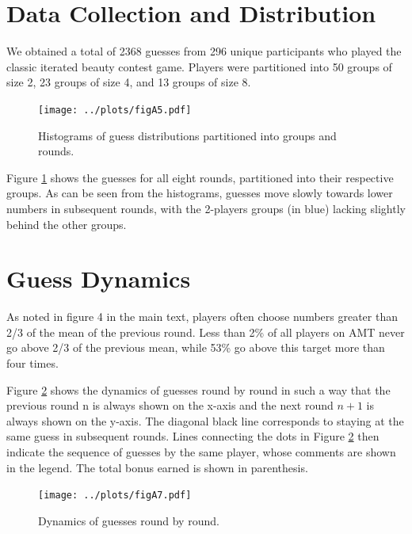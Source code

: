 \section{Data Collection and Distribution}
We obtained a total of 2368 guesses from 296 unique participants who played the classic iterated beauty contest game. Players were partitioned into 50 groups of size 2, 23 groups of size 4, and 13 groups of size 8.


\begin{figure}
\texttt{[image: ../plots/figA5.pdf]}\caption{Histograms of guess distributions partitioned into groups and rounds.}
\label{Fig S5}
\end{figure}

Figure \ref{Fig S5} shows the guesses for all eight rounds, partitioned into their respective groups. As can be seen from the histograms, guesses move slowly towards lower numbers in subsequent rounds, with the 2-players groups (in blue) lacking slightly behind the other groups.

\section{Guess Dynamics}
As noted in figure 4 in the main text, players often choose numbers greater than 2/3 of the mean of the previous round. Less than 2\% of all players on AMT never go above 2/3 of the previous mean, while 53\% go above this target more than four times. 

%
%
Figure \ref{Fig S7} shows the dynamics of guesses round by round in such a way that the previous round n is always shown on the x-axis and the next round $n+1$ is always shown on the y-axis. The diagonal black line corresponds to staying at the same guess in subsequent rounds. Lines connecting the dots in Figure \ref{Fig S7} then indicate the sequence of guesses by the same player, whose comments are shown in the legend. The total bonus earned is shown in parenthesis.

\begin{figure}
\texttt{[image: ../plots/figA7.pdf]}\caption{Dynamics of guesses round by round.}
\label{Fig S7}
\end{figure}
